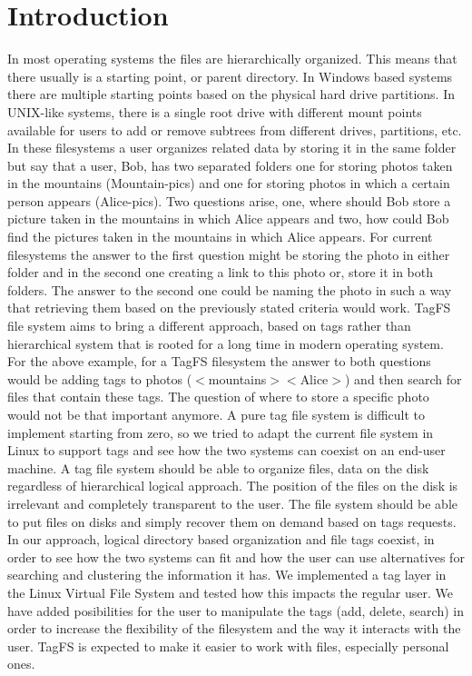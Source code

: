 \section{Introduction}
In most operating systems the files are hierarchically organized. 
This means that there usually is a starting point, or parent directory. 
In Windows based systems there are multiple starting points 
based on the physical hard drive partitions. In UNIX-like systems, 
there is a single root drive with different mount points available for users
to add or remove subtrees from different drives, partitions, etc. 
In these filesystems a user organizes related data by storing it in the same 
folder but say that a user, Bob, has two separated folders one for storing
photos taken in the mountains (Mountain-pics) and one for storing photos in which 
a certain person appears (Alice-pics). Two questions arise, one, where should 
Bob store a picture taken in the mountains in which Alice appears and two, how 
could Bob find the pictures taken in the mountains in which Alice appears. For 
current
filesystems the answer to the first question might be storing the photo in either
folder and in the second one creating a link to this photo or, store it in both
folders. The answer to the second one could be naming the photo in such a way
that retrieving them based on the previously stated criteria would work. 
TagFS file system aims to bring a different approach, based on tags rather than 
hierarchical system that is rooted for a long time in modern operating system. 
For the above example, for a TagFS filesystem the answer to both questions would
be adding tags to photos ($<$mountains$><$Alice$>$) and then search for files that 
contain these tags. The question of where to store a specific photo 
 would not be that important anymore. 
A pure tag file system is difficult to implement starting from zero, so we tried
to adapt the current file system in Linux to support tags and see how the two 
systems can coexist on an end-user machine. 
A tag file system should be able to organize files, data on the disk regardless of 
hierarchical logical approach. The position of the files on the disk is irrelevant and 
completely transparent to the user. The file system should be able to put files on disks
and simply recover them on demand based on tags requests. 
In our approach, logical directory based organization and file tags coexist, in order
to see how the two systems can fit and how the user can use alternatives for searching
and clustering the information it has. 
We implemented a tag layer in the Linux Virtual File System and tested how this impacts 
the regular user. We have added posibilities for the user to manipulate the tags (add, delete,
 search) in order to increase the flexibility of the filesystem and the way it interacts with the user.
TagFS is expected to make it easier to work with files, especially personal ones.

